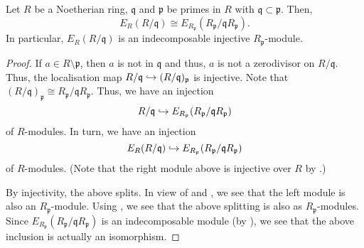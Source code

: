 \begin{cor} \label{cor:injective-hull-inclusion-primes}
	Let $R$ be a Noetherian ring, $\mathfrak{q}$ and $\mathfrak{p}$ be primes in $R$ with $\mathfrak{q} \subset \mathfrak{p}$. Then,
	\begin{equation*} 
		E_{R}(R/\mathfrak{q}) \cong E_{R_{\mathfrak{p}}}(R_{\mathfrak{p}}/\mathfrak{q} R_{\mathfrak{p}}).
	\end{equation*}
	In particular, $E_{R}(R/\mathfrak{q})$ is an indecomposable injective $R_{\mathfrak{p}}$-module.
\end{cor}
\begin{proof} 
	If $a \in R \setminus \mathfrak{p}$, then $a$ is not in $\mathfrak{q}$ and thus, $a$ is not a zerodivisor on $R/\mathfrak{q}$. Thus, the localisation map $R/\mathfrak{q} \hookrightarrow (R/\mathfrak{q})_{\mathfrak{p}}$ is injective. Note that $(R/\mathfrak{q})_{\mathfrak{p}} \cong R_{\mathfrak{p}}/\mathfrak{q} R_{\mathfrak{p}}$. Thus, we have an injection
	\begin{equation*} 
		R/\mathfrak{q} \hookrightarrow E_{R_{\mathfrak{p}}}(R_{\mathfrak{p}}/\mathfrak{q} R_{\mathfrak{p}})
	\end{equation*}
	of $R$-modules. In turn, we have an injection
	\begin{equation*} 
		E_{R}(R/\mathfrak{q}) \hookrightarrow E_{R_{\mathfrak{p}}}(R_{\mathfrak{p}}/\mathfrak{q} R_{\mathfrak{p}})
	\end{equation*}
	of $R$-modules. (Note that the right module above is injective over $R$ by .)

	By injectivity, the above splits. In view of  and , we see that the left module is also an $R_{\mathfrak{p}}$-module. Using , we see that the above splitting is also as $R_{\mathfrak{p}}$-modules. Since $E_{R_{\mathfrak{p}}}(R_{\mathfrak{p}}/\mathfrak{q} R_{\mathfrak{p}})$ is an indecomposable module (by ), we see that the above inclusion is actually an isomorphism.
\end{proof}

